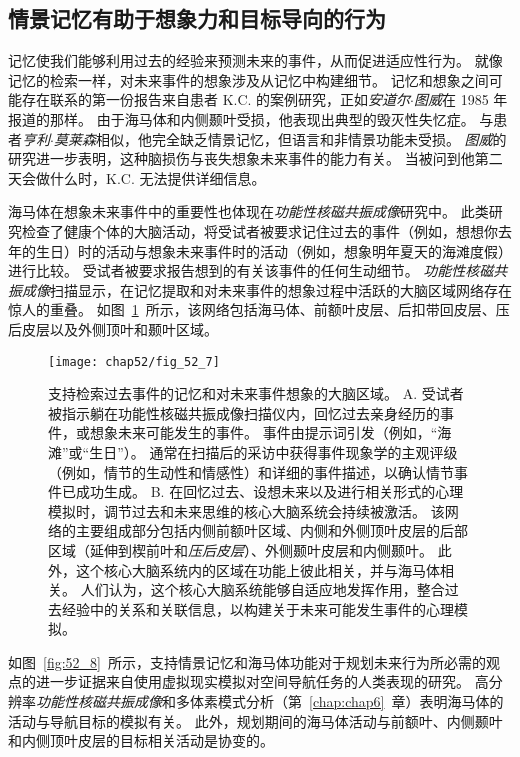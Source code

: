 \subsection{情景记忆有助于想象力和目标导向的行为}

记忆使我们能够利用过去的经验来预测未来的事件，从而促进适应性行为。
就像记忆的检索一样，对未来事件的想象涉及从记忆中构建细节。
记忆和想象之间可能存在联系的第一份报告来自患者 K.C. 的案例研究，正如\textit{安道尔$\cdot$图威}在 1985 年报道的那样。
由于海马体和内侧颞叶受损，他表现出典型的毁灭性失忆症。
与患者\textit{亨利$\cdot$莫莱森}相似，他完全缺乏情景记忆，但语言和非情景功能未受损。
\textit{图威}的研究进一步表明，这种脑损伤与丧失想象未来事件的能力有关。
当被问到他第二天会做什么时，K.C. 无法提供详细信息。


海马体在想象未来事件中的重要性也体现在\textit{功能性核磁共振成像}研究中。
此类研究检查了健康个体的大脑活动，将受试者被要求记住过去的事件（例如，想想你去年的生日）时的活动与想象未来事件时的活动（例如，想象明年夏天的海滩度假）进行比较。
受试者被要求报告想到的有关该事件的任何生动细节。
\textit{功能性核磁共振成像}扫描显示，在记忆提取和对未来事件的想象过程中活跃的大脑区域网络存在惊人的重叠。
如图~\ref{fig:52_7}~所示，该网络包括海马体、前额叶皮层、后扣带回皮层、压后皮层以及外侧顶叶和颞叶区域。


\begin{figure}[htbp]
	\centering
	\texttt{[image: chap52/fig\_52\_7]}
	\caption{支持检索过去事件的记忆和对未来事件想象的大脑区域\cite{schacter2017episodic}。
		A. 受试者被指示躺在功能性核磁共振成像扫描仪内，回忆过去亲身经历的事件，或想象未来可能发生的事件。
		事件由提示词引发（例如，“海滩”或“生日”）。
		通常在扫描后的采访中获得事件现象学的主观评级（例如，情节的生动性和情感性）和详细的事件描述，以确认情节事件已成功生成。
		B. 在回忆过去、设想未来以及进行相关形式的心理模拟时，调节过去和未来思维的核心大脑系统会持续被激活。
		该网络的主要组成部分包括内侧前额叶区域、内侧和外侧顶叶皮层的后部区域（延伸到楔前叶和\textit{压后皮层}）、外侧颞叶皮层和内侧颞叶。
		此外，这个核心大脑系统内的区域在功能上彼此相关，并与海马体相关。
		人们认为，这个核心大脑系统能够自适应地发挥作用，整合过去经验中的关系和关联信息，以构建关于未来可能发生事件的心理模拟。}
	\label{fig:52_7}
\end{figure}


如图~\ref{fig:52_8}~所示，支持情景记忆和海马体功能对于规划未来行为所必需的观点的进一步证据来自使用虚拟现实模拟对空间导航任务的人类表现的研究。
高分辨率\textit{功能性核磁共振成像}和多体素模式分析（第~\ref{chap:chap6}~章）表明海马体的活动与导航目标的模拟有关。
此外，规划期间的海马体活动与前额叶、内侧颞叶和内侧顶叶皮层的目标相关活动是协变的。


